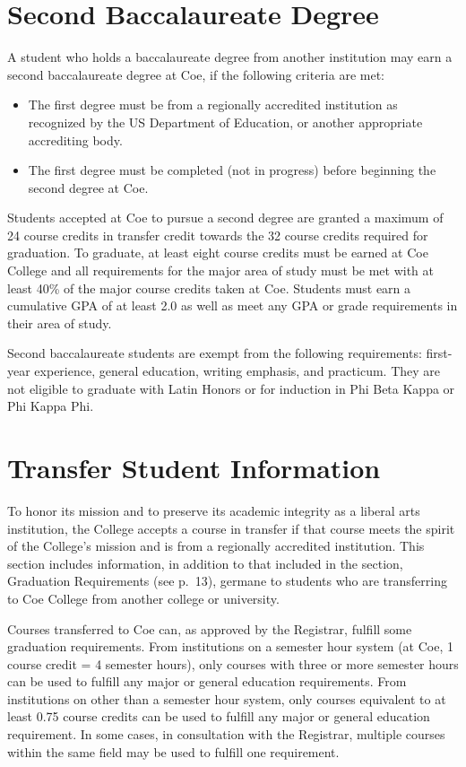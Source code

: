 \documentclass[
  letterpaper,
]{scrbook}
\providecommand{\tightlist}{%
  \setlength{\itemsep}{0pt}\setlength{\parskip}{0pt}}
\begin{document}
\section{Second Baccalaureate Degree}\label{second-baccalaureate-degree}

A student who holds a baccalaureate degree from another institution may
earn a second baccalaureate degree at Coe, if the following criteria are
met:

\begin{itemize}
\tightlist
\item
  The first degree must be from a regionally accredited institution as
  recognized by the US Department of Education, or another appropriate
  accrediting body.
\item
  The first degree must be completed (not in progress) before beginning
  the second degree at Coe.
\end{itemize}

Students accepted at Coe to pursue a second degree are granted a maximum
of 24 course credits in transfer credit towards the 32 course credits
required for graduation. To graduate, at least eight course credits must
be earned at Coe College and all requirements for the major area of
study must be met with at least 40\% of the major course credits taken
at Coe. Students must earn a cumulative GPA of at least 2.0 as well as
meet any GPA or grade requirements in their area of study.

Second baccalaureate students are exempt from the following
requirements: first-year experience, general education, writing
emphasis, and practicum. They are not eligible to graduate with Latin
Honors or for induction in Phi Beta Kappa or Phi Kappa Phi.

\section{Transfer Student
Information}\label{transfer-student-information}

To honor its mission and to preserve its academic integrity as a liberal
arts institution, the College accepts a course in transfer if that
course meets the spirit of the College's mission and is from a
regionally accredited institution. This section includes information, in
addition to that included in the section, Graduation Requirements (see
p.~13), germane to students who are transferring to Coe College from
another college or university.

Courses transferred to Coe can, as approved by the Registrar, fulfill
some graduation requirements. From institutions on a semester hour
system (at Coe, 1 course credit = 4 semester hours), only courses with
three or more semester hours can be used to fulfill any major or general
education requirements. From institutions on other than a semester hour
system, only courses equivalent to at least 0.75 course credits can be
used to fulfill any major or general education requirement. In some
cases, in consultation with the Registrar, multiple courses within the
same field may be used to fulfill one requirement.
\end{document}
